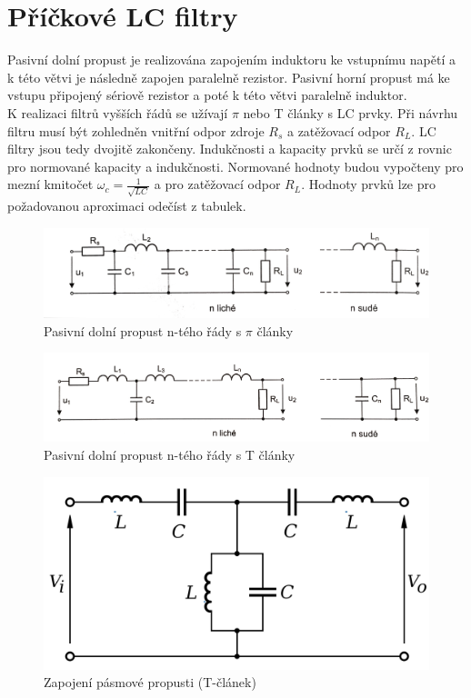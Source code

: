 \documentclass[twoside]{article}
\begin{document}
\section{Příčkové LC filtry}
Pasivní dolní propust je realizována zapojením induktoru ke vstupnímu napětí a k této větvi je následně zapojen paralelně rezistor. Pasivní horní propust má ke vstupu připojený sériově rezistor a poté k této větvi paralelně induktor. \\
K realizaci filtrů vyšších řádů se užívají $\pi$ nebo T články s LC prvky. Při návrhu filtru musí být zohledněn vnitřní odpor zdroje $R_s$ a zatěžovací odpor $R_L$. LC filtry jsou tedy dvojitě zakončeny. Indukčnosti a kapacity prvků se určí z rovnic pro normované kapacity a indukčnosti. Normované hodnoty budou vypočteny pro mezní kmitočet $\omega _c = \frac{1}{\sqrt{LC}}$ a pro zatěžovací odpor $R_L$. Hodnoty prvků lze pro požadovanou aproximaci odečíst z tabulek. \\
\begin{figure}[H]
\centering
\includegraphics[scale=0.1]{piclanky.png}
\caption{Pasivní dolní propust n-tého řády s $\pi$ články \cite{12}}
\end{figure}
\begin{figure}[H]
\centering
\includegraphics[scale=0.08]{tclanky.png}
\caption{Pasivní dolní propust n-tého řády s T články \cite{12}}
\end{figure}
\begin{figure}[H]
\centering
\includegraphics[scale=0.1]{Bandpass_Filter.png}
\caption{Zapojení pásmové propusti (T-článek) \cite{13}}
\end{figure}
\end{document}
